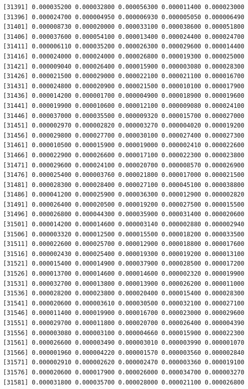 \documentclass[]{article}
\begin{document}
\begin{verbatim}
[31391] 0.000035200 0.000032800 0.000056300 0.000011400 0.000023000
[31396] 0.000024700 0.000004950 0.000006930 0.000005050 0.000006490
[31401] 0.000008730 0.000020000 0.000033100 0.000038600 0.000051800
[31406] 0.000037600 0.000054100 0.000013400 0.000024400 0.000024700
[31411] 0.000006110 0.000035200 0.000026300 0.000029600 0.000014400
[31416] 0.000024000 0.000024000 0.000026800 0.000019300 0.000025000
[31421] 0.000009040 0.000026400 0.000015900 0.000003080 0.000028300
[31426] 0.000021500 0.000029000 0.000022100 0.000021100 0.000016700
[31431] 0.000024800 0.000020900 0.000021500 0.000010100 0.000017900
[31436] 0.000014200 0.000001700 0.000004900 0.000018900 0.000019600
[31441] 0.000019900 0.000010600 0.000012100 0.000009080 0.000024100
[31446] 0.000037000 0.000035500 0.000009320 0.000015700 0.000027000
[31451] 0.000002970 0.000002820 0.000003270 0.000004020 0.000019200
[31456] 0.000029800 0.000027700 0.000030100 0.000027400 0.000027300
[31461] 0.000010500 0.000015900 0.000019000 0.000002410 0.000022600
[31466] 0.000022900 0.000026600 0.000017100 0.000022300 0.000023800
[31471] 0.000029600 0.000024100 0.000020700 0.000008570 0.000026900
[31476] 0.000025400 0.000003760 0.000021800 0.000017000 0.000021500
[31481] 0.000028300 0.000028400 0.000027100 0.000045100 0.000038800
[31486] 0.000041200 0.000025900 0.000036300 0.000012900 0.000002820
[31491] 0.000026400 0.000020500 0.000019200 0.000027500 0.000015500
[31496] 0.000026800 0.000044300 0.000035900 0.000031400 0.000020600
[31501] 0.000014200 0.000014600 0.000003140 0.000002880 0.000002940
[31506] 0.000003320 0.000012500 0.000015500 0.000018200 0.000033500
[31511] 0.000022600 0.000025700 0.000012900 0.000018800 0.000017600
[31516] 0.000002430 0.000025400 0.000019300 0.000019200 0.000013100
[31521] 0.000015400 0.000014900 0.000037900 0.000028500 0.000017200
[31526] 0.000013700 0.000014600 0.000014600 0.000002320 0.000019900
[31531] 0.000032700 0.000013800 0.000013900 0.000026200 0.000011000
[31536] 0.000028200 0.000023800 0.000020400 0.000015400 0.000028300
[31541] 0.000020600 0.000003610 0.000030500 0.000032100 0.000027100
[31546] 0.000011400 0.000019900 0.000016700 0.000023000 0.000029600
[31551] 0.000029700 0.000011800 0.000020700 0.000026400 0.000004390
[31556] 0.000003080 0.000003100 0.000004660 0.000015900 0.000022300
[31561] 0.000026600 0.000003490 0.000003010 0.000003990 0.000001070
[31566] 0.000001960 0.000004220 0.000001570 0.000003560 0.000002840
[31571] 0.000002910 0.000002620 0.000002470 0.000003360 0.000019100
[31576] 0.000020600 0.000017900 0.000026000 0.000034700 0.000003270
[31581] 0.000031800 0.000035700 0.000028000 0.000021100 0.000026800

\end{verbatim}
\end{document}
